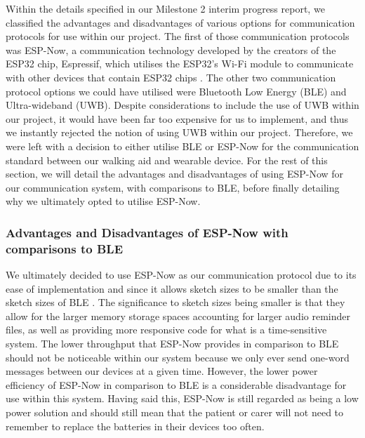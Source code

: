                     Within the details specified in our Milestone 2 interim progress report, we classified the advantages and disadvantages of various options for communication protocols for use within our project. The first of those communication protocols was ESP-Now, a communication technology developed by the creators of the ESP32 chip, Espressif, which utilises the ESP32's Wi-Fi module to communicate with other devices that contain ESP32 chips \cite{esp-now_overview}. The other two communication protocol options we could have utilised were Bluetooth Low Energy (BLE) and Ultra-wideband (UWB). Despite considerations to include the use of UWB within our project, it would have been far too expensive for us to implement, and thus we instantly rejected the notion of using UWB within our project. Therefore, we were left with a decision to either utilise BLE or ESP-Now for the communication standard between our walking aid and wearable device. For the rest of this section, we will detail the advantages and disadvantages of using ESP-Now for our communication system, with comparisons to BLE, before finally detailing why we ultimately opted to utilise ESP-Now.
        
                    \newpage
                    \subsubsection{Advantages and Disadvantages of ESP-Now with comparisons to BLE}
                    \label{subsubsec:esp_now_advantages_disadvantages}
        
                        \vspace{2em}
                        
                        \vspace{5em}
        
                        We ultimately decided to use ESP-Now as our communication protocol due to its ease of implementation and since it allows sketch sizes to be smaller \cite{random_nerd_tutorials} than the sketch sizes of BLE \cite{kolban_2018}. The significance to sketch sizes being smaller is that they allow for the larger memory storage spaces accounting for larger audio reminder files, as well as providing more responsive code for what is a time-sensitive system. The lower throughput that ESP-Now provides in comparison to BLE should not be noticeable within our system because we only ever send one-word messages between our devices at a given time. However, the lower power efficiency of ESP-Now in comparison to BLE is a considerable disadvantage for use within this system. Having said this, ESP-Now is still regarded as being a low power solution and should still mean that the patient or carer will not need to remember to replace the batteries in their devices too often.
        
